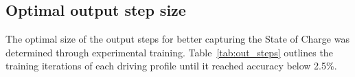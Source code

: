 \subsection{Optimal output step size}
    The optimal size of the output steps for better capturing the State of Charge was determined through experimental training. \mbox{Table~\ref{tab:out_steps}} outlines the training iterations of each driving profile until it reached accuracy below 2.5\%.
    \begin{table}[htbp]
        \renewcommand{\arraystretch}{1.3}
        \caption{Percentage accuracy evaluation with increasing output step size}
        \centering
        \label{tab:out_steps}
    \end{table}
    
